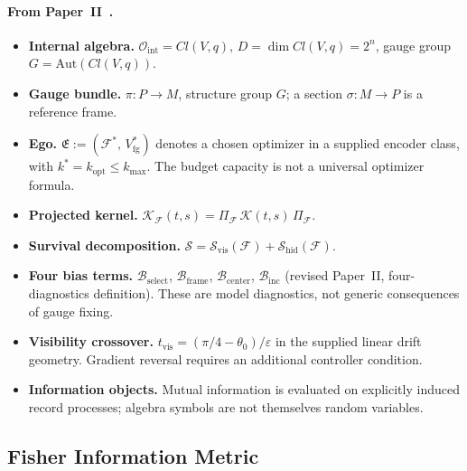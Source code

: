 \documentclass[12pt]{article}
\begin{document}
\paragraph{From Paper~II~\cite{Liu2026TDOME_II}.}
\begin{itemize}
\item \textbf{Internal algebra.}
  $\mathcal{O}_{\mathrm{int}} = Cl(V,q)$, $D = \dim Cl(V,q) = 2^n$,
  gauge group $G = \mathrm{Aut}(Cl(V,q))$.
\item \textbf{Gauge bundle.}
  $\pi: P \to M$, structure group $G$; a section
  $\sigma: M \to P$ is a reference frame.
\item \textbf{Ego.}
  $\mathfrak{E} := (\mathcal{F}^*,\,V_{\mathrm{fg}}^*)$
  denotes a chosen optimizer in a supplied encoder class, with
  $k^*=k_{\mathrm{opt}}\leq k_{\max}$.  The budget capacity is not a
  universal optimizer formula.
\item \textbf{Projected kernel.}
  $\mathcal{K}_{\mathcal{F}}(t,s)
  = \Pi_{\mathcal{F}}\,\mathcal{K}(t,s)\,
  \Pi_{\mathcal{F}}$.
\item \textbf{Survival decomposition.}
  $\mathcal{S} = \mathcal{S}_{\mathrm{vis}}(\mathcal{F})
  + \mathcal{S}_{\mathrm{hid}}(\mathcal{F})$.
\item \textbf{Four bias terms.}
  $\mathcal{B}_{\mathrm{select}}$,
  $\mathcal{B}_{\mathrm{frame}}$,
  $\mathcal{B}_{\mathrm{center}}$,
  $\mathcal{B}_{\mathrm{inc}}$
  (revised Paper~II, four-diagnostics definition).  These are model
  diagnostics, not generic consequences of gauge fixing.
\item \textbf{Visibility crossover.}
  $t_{\mathrm{vis}}=(\pi/4-\theta_0)/\varepsilon$ in the supplied
  linear drift geometry.  Gradient reversal requires an additional
  controller condition.
\item \textbf{Information objects.}
  Mutual information is evaluated on explicitly induced record
  processes; algebra symbols are not themselves random variables.
\end{itemize}

\subsection{Fisher Information Metric}
\label{subsec:fisher}
\end{document}
